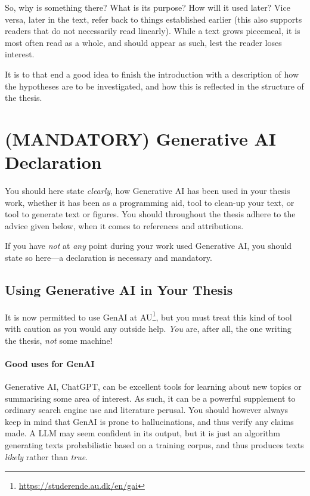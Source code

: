So, why is something there? What is its purpose? How will it used later?
Vice versa, later in the text, refer back to things established earlier
(this also supports readers that do not necessarily read linearly). While a
text grows piecemeal, it is most often read as a whole, and should appear as
such, lest the reader loses interest.

It is to that end a good idea to finish the introduction with a description
of how the hypotheses are to be investigated, and how this is reflected in
the structure of the thesis.



\section{(MANDATORY) Generative AI Declaration}
\label{sec:gener-ai-decl}

You should here state \emph{clearly}, how Generative AI has been used in your thesis work, whether it has been as a programming aid, tool to clean-up your text, or tool to generate text or figures. You should throughout the thesis adhere to the advice given below, when it comes to references and attributions.

If you have \emph{not} at \emph{any} point during your work used Generative AI, you should state so here---a declaration is necessary and mandatory.


\subsection{Using Generative AI in Your Thesis}
\label{sec:using-generative-ai}

It is now permitted to use GenAI at AU\footnote{\url{https://studerende.au.dk/en/gai}}, but you must treat this kind of tool with caution as you would any outside help. \emph{You} are, after all, the one writing the thesis, \emph{not} some machine!

\paragraph{Good uses for GenAI} Generative AI, \eg ChatGPT, can be excellent tools for learning about new topics or summarising some area of interest. As such, it can be a powerful supplement to ordinary search engine use and literature perusal. You should however always keep in mind that GenAI is prone to hallucinations, and thus verify any claims made. A \ac{LLM} may seem confident in its output, but it is just an algorithm generating texts probabilistic based on a training corpus, and thus produces texts  \emph{likely} rather than \emph{true}.

